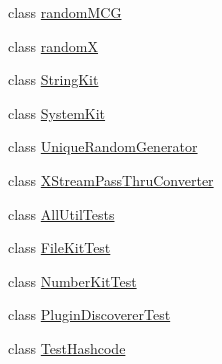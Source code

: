 \begin{DoxyCompactItemize}
class \hyperlink{classorg_1_1jgap_1_1util_1_1random_m_c_g}{random\-M\-C\-G}
\item 
class \hyperlink{classorg_1_1jgap_1_1util_1_1random_x}{random\-X}
\item 
class \hyperlink{classorg_1_1jgap_1_1util_1_1_string_kit}{String\-Kit}
\item 
class \hyperlink{classorg_1_1jgap_1_1util_1_1_system_kit}{System\-Kit}
\item 
class \hyperlink{classorg_1_1jgap_1_1util_1_1_unique_random_generator}{Unique\-Random\-Generator}
\item 
class \hyperlink{classorg_1_1jgap_1_1util_1_1_x_stream_pass_thru_converter}{X\-Stream\-Pass\-Thru\-Converter}
\item 
class \hyperlink{classorg_1_1jgap_1_1util_1_1_all_util_tests}{All\-Util\-Tests}
\item 
class \hyperlink{classorg_1_1jgap_1_1util_1_1_file_kit_test}{File\-Kit\-Test}
\item 
class \hyperlink{classorg_1_1jgap_1_1util_1_1_number_kit_test}{Number\-Kit\-Test}
\item 
class \hyperlink{classorg_1_1jgap_1_1util_1_1_plugin_discoverer_test}{Plugin\-Discoverer\-Test}
\item 
class \hyperlink{classorg_1_1jgap_1_1util_1_1_test_hashcode}{Test\-Hashcode}
\end{DoxyCompactItemize}
